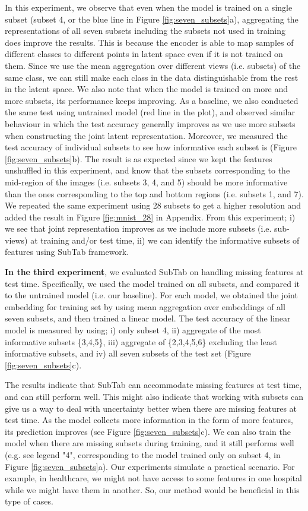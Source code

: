 In this experiment, we observe that even when the model is trained on a single subset (subset 4, or the blue line in Figure \ref{fig:seven_subsets}a), aggregating the representations of all seven subsets including the subsets not used in training does improve the results. This is because the encoder is able to map samples of different classes to different points in latent space even if it is not trained on them. Since we use the mean aggregation over different views (i.e. subsets) of the same class, we can still make each class in the data distinguishable from the rest in the latent space. We also note that when the model is trained on more and more subsets, its performance keeps improving. As a baseline, we also conducted the same test using untrained model (red line in the plot), and observed similar behaviour in which the test accuracy generally improves as we use more subsets when constructing the joint latent representation. Moreover, we measured the test accuracy of individual subsets to see how informative each subset is (Figure \ref{fig:seven_subsets}b). The result is as expected since we kept the features unshuffled in this experiment, and know that the subsets corresponding to the mid-region of the images (i.e. subsets 3, 4, and 5) should be more informative than the ones corresponding to the top and bottom regions (i.e. subsets 1, and 7). We repeated the same experiment using 28 subsets to get a higher resolution and added the result in Figure \ref{fig:mnist_28} in Appendix. From this experiment; i) we see that joint representation improves as we include more subsets (i.e. sub-views) at training and/or test time, ii) we can identify the informative subsets of features using SubTab framework.

\textbf{In the third experiment}, we evaluated SubTab on handling missing features at test time. Specifically, we used the model trained on all subsets, and compared it to the untrained model (i.e. our baseline). For each model, we obtained the joint embedding for training set by using mean aggregation over embeddings of all seven subsets, and then trained a linear model. The test accuracy of the linear model is measured by using; i) only subset 4, ii) aggregate of the most informative subsets \{3,4,5\}, iii) aggregate of \{2,3,4,5,6\} excluding the least informative subsets, and iv) all seven subsets of the test set (Figure \ref{fig:seven_subsets}c).

The results indicate that SubTab can accommodate missing features at test time, and can still perform well. This might also indicate that working with subsets can give us a way to deal with uncertainty better when there are missing features at test time. As the model collects more information in the form of more features, its prediction improves (see Figure \ref{fig:seven_subsets}c). We can also train the model when there are missing subsets during training, and it still performs well (e.g. see legend "4", corresponding to the model trained only on subset 4, in Figure \ref{fig:seven_subsets}a). Our experiments simulate a practical scenario. For example, in healthcare, we might not have access to some features in one hospital while we might have them in another. So, our method would be beneficial in this type of cases.

